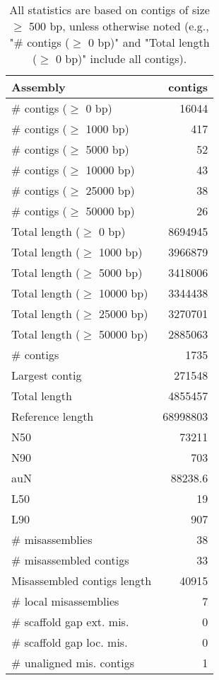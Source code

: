 \documentclass[12pt,a4paper]{article}
\begin{document}
\begin{table}[ht]
\begin{center}
\caption{All statistics are based on contigs of size $\geq$ 500 bp, unless otherwise noted (e.g., "\# contigs ($\geq$ 0 bp)" and "Total length ($\geq$ 0 bp)" include all contigs).}
\begin{tabular}{|l*{1}{|r}|}
\hline
Assembly & contigs \\ \hline
\# contigs ($\geq$ 0 bp) & 16044 \\ \hline
\# contigs ($\geq$ 1000 bp) & 417 \\ \hline
\# contigs ($\geq$ 5000 bp) & 52 \\ \hline
\# contigs ($\geq$ 10000 bp) & 43 \\ \hline
\# contigs ($\geq$ 25000 bp) & 38 \\ \hline
\# contigs ($\geq$ 50000 bp) & 26 \\ \hline
Total length ($\geq$ 0 bp) & 8694945 \\ \hline
Total length ($\geq$ 1000 bp) & 3966879 \\ \hline
Total length ($\geq$ 5000 bp) & 3418006 \\ \hline
Total length ($\geq$ 10000 bp) & 3344438 \\ \hline
Total length ($\geq$ 25000 bp) & 3270701 \\ \hline
Total length ($\geq$ 50000 bp) & 2885063 \\ \hline
\# contigs & 1735 \\ \hline
Largest contig & 271548 \\ \hline
Total length & 4855457 \\ \hline
Reference length & 68998803 \\ \hline
N50 & 73211 \\ \hline
N90 & 703 \\ \hline
auN & 88238.6 \\ \hline
L50 & 19 \\ \hline
L90 & 907 \\ \hline
\# misassemblies & 38 \\ \hline
\# misassembled contigs & 33 \\ \hline
Misassembled contigs length & 40915 \\ \hline
\# local misassemblies & 7 \\ \hline
\# scaffold gap ext. mis. & 0 \\ \hline
\# scaffold gap loc. mis. & 0 \\ \hline
\# unaligned mis. contigs & 1 \\ \hline

\end{tabular}
\end{center}
\end{table}
\end{document}
